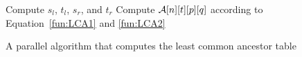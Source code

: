\begin{algorithm}[!thb]
\SetAlgoNoLine
{}

 {
   {
     {
      Compute $s_l$, $t_l$, $s_r$, and $t_r$ \;
       {
        Compute ${\cal A}[n][t][p][q]$ according to Equation~\ref{fun:LCA1} and \ref{fun:LCA2} \;
      }
    }
  }
}

\caption{A parallel algorithm that computes the least common ancestor table}
\label{alg:parallel-LCA}
\end{algorithm}
